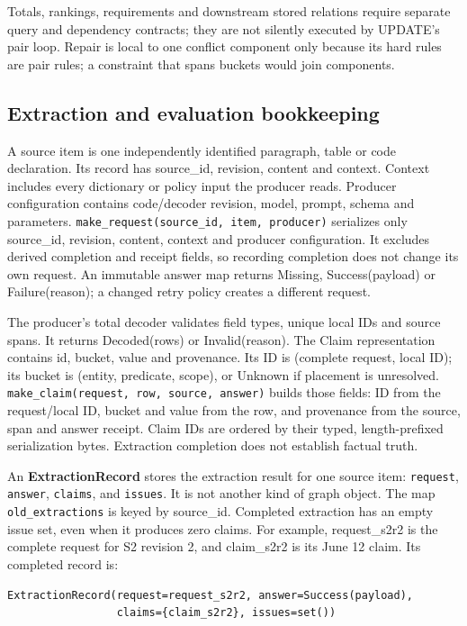 \documentclass[11pt]{article}
\newcommand{\code}[1]{\texttt{#1}}
\begin{document}
Totals, rankings, requirements and downstream stored relations require separate
query and dependency contracts; they are not silently executed by UPDATE's pair
loop. Repair is local to one conflict component only because its hard rules
are pair rules; a constraint that spans buckets would join components.

\subsection{Extraction and evaluation bookkeeping}

A source item is one independently identified paragraph, table or code
declaration. Its record has source\_id, revision, content and context. Context
includes every dictionary or policy input the producer reads. Producer
configuration contains code/decoder revision, model, prompt, schema and parameters.
\code{make\_request(source\_id, item, producer)} serializes only source\_id,
revision, content, context and producer configuration. It excludes derived
completion and receipt fields, so recording completion does not change its own
request.
An immutable answer map returns Missing, Success(payload) or Failure(reason);
a changed retry policy creates a different request.

The producer's total decoder validates field types, unique local IDs and source
spans. It returns Decoded(rows) or Invalid(reason). The Claim representation contains
id, bucket, value and provenance. Its ID is (complete request, local ID); its
bucket is (entity, predicate, scope), or Unknown if placement is unresolved.
\code{make\_claim(request, row, source, answer)} builds those fields: ID from
the request/local ID, bucket and value from the row, and provenance from the
source, span and answer receipt. Claim IDs are ordered by their
typed, length-prefixed serialization bytes. Extraction completion does not
establish factual truth.

An \textbf{ExtractionRecord} stores the extraction result for one source item:
\code{request}, \code{answer}, \code{claims}, and \code{issues}. It is not another
kind of graph object. The map \code{old\_extractions} is keyed by source\_id.
Completed extraction has an empty issue set, even when it produces zero claims.
For example, request\_s2r2 is the complete request for S2 revision 2, and
claim\_s2r2 is its June 12 claim. Its completed record is:

\begin{minipage}{\linewidth}{\small
\begin{verbatim}
ExtractionRecord(request=request_s2r2, answer=Success(payload),
                 claims={claim_s2r2}, issues=set())
\end{verbatim}}\end{minipage}
\end{document}
